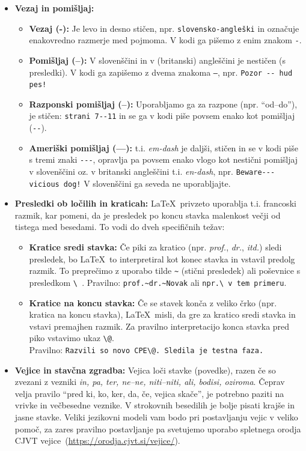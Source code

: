 \documentclass[a4paper,12pt,openright]{book}
\begin{document}
\begin{itemize}
    \item \textbf{Vezaj in pomišljaj:} 
    \begin{itemize}
        \item \textbf{Vezaj (-):} Je levo in desno stičen, npr. \verb=slovensko-angleški= in označuje enakovredno razmerje med pojmoma. V kodi ga pišemo z enim znakom \texttt{-}.
        \item \textbf{Pomišljaj (--):} V slovenščini in v (britanski) angleščini je nestičen (s presledki). V kodi ga zapišemo z dvema znakoma \texttt{--}, npr. \verb=Pozor -- hud pes! =
        \item \textbf{Razponski pomišljaj (--):} Uporabljamo ga za razpone (npr. \enquote{od--do}), je stičen: \verb=strani 7--11= in se ga v kodi piše povsem enako kot pomišljaj (\verb=--=).
        \item \textbf{Ameriški pomišljaj (---):} t.i. \textit{em-dash} je daljši, stičen in se v kodi piše s tremi znaki \verb=---=, opravlja pa povsem enako vlogo kot nestični pomišljaj v slovenščini oz. v britanski angleščini t.i. \textit{en-dash}, npr. \verb=Beware---vicious dog!= V slovenščini ga seveda ne uporabljajte.
    \end{itemize}

    \item \textbf{Presledki ob ločilih in kraticah:} \LaTeX\ privzeto uporablja t.i. francoski razmik, kar pomeni, da je presledek po koncu stavka malenkost večji od tistega med besedami. To vodi do dveh specifičnih težav:
    \begin{itemize}
        \item \textbf{Kratice sredi stavka:} Če piki za kratico (npr. \textit{prof.}, \textit{dr.}, \textit{itd.}) sledi presledek, bo \LaTeX\ to interpretiral kot konec stavka in vstavil predolg razmik. To preprečimo z uporabo tilde \texttt{\~} (stični presledek) ali poševnice s presledkom \texttt{\textbackslash\ }. Pravilno: \verb|prof.~dr.~Novak| ali \verb|npr.\ v tem primeru|.
        \item \textbf{Kratice na koncu stavka:} Če se stavek konča z veliko črko (npr. kratica na koncu stavka), \LaTeX\ misli, da gre za kratico sredi stavka in vstavi premajhen razmik. Za pravilno interpretacijo konca stavka pred piko vstavimo ukaz \texttt{\textbackslash @}. \\Pravilno: \verb|Razvili so novo CPE\@. Sledila je testna faza.|
    \end{itemize}
    
    \item \textbf{Vejice in stavčna zgradba:} Vejica loči stavke (povedke), razen če so zvezani z vezniki \textit{in, pa, ter, ne–ne, niti–niti, ali, bodisi, oziroma}. Čeprav velja pravilo \enquote{pred ki, ko, ker, da, če, vejica skače}, je potrebno paziti na vrivke in večbesedne veznike. V strokovnih besedilih je bolje pisati krajše in jasne stavke. Veliki jezikovni modeli vam bodo pri postavljanju vejic v veliko pomoč, za zares pravilno postavljanje pa svetujemo uporabo spletnega orodja CJVT vejice~(\url{https://orodja.cjvt.si/vejice/}).
    

\end{itemize}
\end{document}
